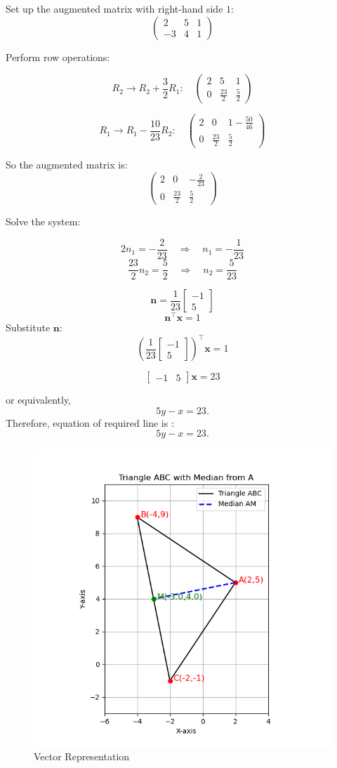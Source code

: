 \documentclass[journal]{IEEEtran}
\begin{document}
Set up the augmented matrix with right-hand side \(1\):
\[
\left(\begin{array}{cc|c}
2 & 5 & 1 \\
-3 & 4 & 1
\end{array}\right)
\]

Perform row operations:

\[
R_2 \to R_2 + \frac{3}{2} R_1:
\quad
\left(\begin{array}{cc|c}
2 & 5 & 1 \\
0 & \frac{23}{2} & \frac{5}{2}
\end{array}\right)
\]

\[
R_1 \to R_1 - \frac{10}{23} R_2:
\quad
\left(\begin{array}{cc|c}
2 & 0 & 1 - \frac{50}{46} \\
0 & \frac{23}{2} & \frac{5}{2}
\end{array}\right)
\]



So the augmented matrix is:
\[
\left(\begin{array}{cc|c}
2 & 0 & -\frac{2}{23} \\
0 & \frac{23}{2} & \frac{5}{2}
\end{array}\right)
\]

Solve the system:

\[
2 n_1 = -\frac{2}{23} \quad \Rightarrow \quad n_1 = -\frac{1}{23}
\]
\[
\frac{23}{2} n_2 = \frac{5}{2} \quad \Rightarrow \quad n_2 = \frac{5}{23}
\]

\[
\mathbf{n} = \frac{1}{23}\begin{bmatrix} -1 \\ 5 \end{bmatrix}
\]
\[
\mathbf{n}^\top \mathbf{x} = 1
\]
Substitute \( \mathbf{n} \):
\[
\left(
\frac{1}{23}
\begin{bmatrix}
-1 \\ 5
\end{bmatrix}
\right)^\top
\mathbf{x} = 1
\]

\[
\begin{bmatrix}
-1 & 5
\end{bmatrix}
\mathbf{x} = 23
\]


or equivalently,
\[
5y - x = 23.
\]
Therefore, equation of required line is  :\[
\boxed{5y - x = 23.}
\]

\begin{figure}[htbp]
    \centering
    \includegraphics[width=0.65\linewidth]{FIG/fig1.png}
    \caption{Vector Representation}
    \label{fig:FIG/fig1.png}
    \end{figure}
\end{document}
